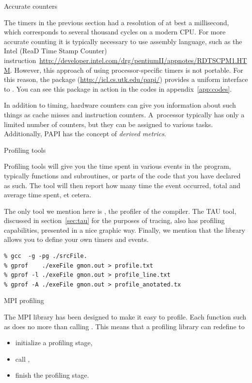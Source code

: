  {Accurate counters}

The timers in the previous section had a resolution of at best a
millisecond, which corresponds to several thousand cycles on a modern
CPU. For more accurate counting it is typically necessary to use
assembly language, such as the Intel  (ReaD Time Stamp
Counter)
instruction~\url{http://developer.intel.com/drg/pentiumII/appnotes/RDTSCPM1.HTM}. However,
this approach of using processor-specific timers is not portable. For
this reason, the  package (\url{http://icl.cs.utk.edu/papi/})
provides a uniform interface to .
You can see this package in action in the codes in
appendix~\ref{app:codes}.

In addition to timing, hardware counters can give you information about 
such things as cache misses and instruction counters. A~processor typically
has only a limited number of counters, but they can be assigned to various tasks.
Additionally, PAPI has the concept of \emph{derived metrics}.

 {Profiling tools}

Profiling tools will give you the time spent in various events in the
program, typically functions and subroutines, or parts of the code
that you have declared as such. The tool will then report how many
time the event occurred, total and average time spent, et cetera.

The only tool we mention here is , the profiler of
the  compiler. The TAU tool, discussed in section~\ref{sec:tau}
for the purposes of tracing,
also has profiling capabilities, presented in a nice graphic way.
Finally, we mention that the  library
allows you to define your own timers and events.

\begin{verbatim}
% gcc  -g -pg ./srcFile.
% gprof    ./exeFile gmon.out > profile.txt
% gprof -l ./exeFile gmon.out > profile_line.txt
% gprof -A ./exeFile gmon.out > profile_anotated.tx
\end{verbatim}

 {MPI profiling}

The MPI library has been designed to make it easy to profile. Each
function such as  does no more than calling
. This means that a profiling library can redefine
 to
\begin{itemize}
\item initialize a profiling stage,\item call , \item
  finish the profiling stage.
\end{itemize}

